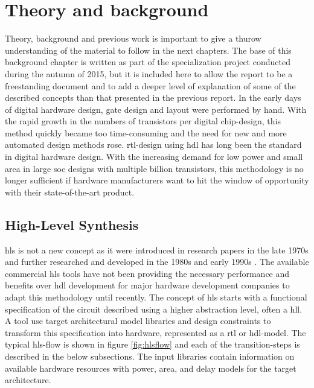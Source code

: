 \chapter{\label{chp:background}Theory and background}
Theory, background and previous work is important to give a thurow understanding of the material to follow in the next chapters. The base of this background chapter is written as part of the specialization project conducted during the autumn of 2015, but it is included here to allow the report to be a freestanding document and to add a deeper level of explanation of some of the described concepts than that presented in the previous report. 
In the early days of digital hardware design, gate design and layout were performed by hand. With the rapid growth in the numbers of transistors per digital chip-design, this method quickly became too time-consuming and the need for new and more automated design methods rose. \gls{rtl}-design using \gls{hdl} has long been the standard in digital hardware design. With the increasing demand for low power and small area in large \gls{soc} designs with multiple billion transistors, this methodology is no longer sufficient if hardware manufacturers want to hit the window of opportunity with their state-of-the-art product.

\section{\label{sec:hls}High-Level Synthesis}

\gls{hls} is not a new concept as it were introduced in research papers in the late 1970s and further researched and developed in the 1980s and early 1990s \cite{martin2009high}. The available commercial \gls{hls} tools have not been providing the necessary performance and benefits over \gls{hdl} development for major hardware development companies to adapt this methodology until recently.
The concept of \gls{hls} starts with a functional specification of the circuit described using a higher abstraction level, often a \gls{hll}. A tool use target architectural model libraries and design constraints to transform this specification into hardware, represented as a \gls{rtl} or \gls{hdl}-model. The typical \gls{hls}-flow is shown in figure \ref{fig:hlsflow} and each of the transition-steps is described in the below subsections. The input libraries contain information on available hardware resources with power, area, and delay models for the target architecture.

